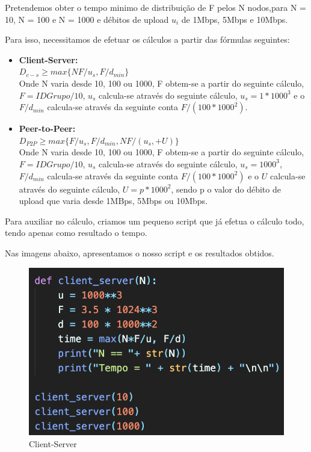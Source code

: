 \documentclass[a4paper, 11pt]{article}
\begin{document}
\vspace{0.5cm}

Pretendemos obter o tempo minimo de distribuição de F pelos N nodos,para N = 10, N = 100 e N = 1000 e débitos de upload $u_i$ de 1Mbps, 5Mbps e 10Mbps.

Para isso, necessitamos de efetuar os cálculos a partir das fórmulas seguintes:
\\

\begin{itemize}
    \item \textbf{Client-Server:}
    \\
    
    
$D_{c-s} \geq max\{NF/u_s,F/d_{min}\}$\\

Onde N varia desde 10, 100 ou 1000, F obtem-se a partir do seguinte cálculo, $F = IDGrupo/10$, $u_s$ calcula-se através do seguinte cálculo, $u_s = 1 * 1000^3$ e o $F/d_{min}$ calcula-se através da seguinte conta $F/(100 * 1000^2)$.

    \item \textbf{Peer-to-Peer:}
    \\
    
    $D_{P2P} \geq max\{F/u_s,F/d_{min},NF/(u_s,+U)\}$\\

Onde N varia desde 10, 100 ou 1000, F obtem-se a partir do seguinte cálculo, $F = IDGrupo/10$, $u_s$ calcula-se através do seguinte cálculo, $u_s = 1000^3$, $F/d_{min}$ calcula-se através da seguinte conta $F/(100 * 1000^2)$ e o $U$ calcula-se através do seguinte cálculo, $U = p * 1000^2$, sendo p o valor do débito de upload que varia desde 1MBps, 5Mbps ou 10Mbps.
\end{itemize}


Para auxiliar no cálculo, criamos um pequeno script que já efetua o cálculo todo, tendo apenas como resultado o tempo.

Nas imagens abaixo, apresentamos o nosso script e os resultados obtidos.

\begin{figure}[h!]
    \centering
    \includegraphics[height=0.3\textwidth, width=0.4\linewidth]{images/C-S.png}
    \caption {Client-Server}
\end{figure}
\end{document}
